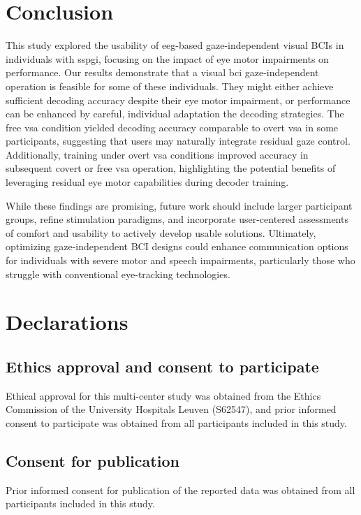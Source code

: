 \documentclass{article}
\begin{document}
\section{Conclusion}
This study explored the usability of \ac{eeg}-based gaze-independent visual BCIs in
individuals with \ac{sspgi}, focusing on the impact of eye motor impairments
on performance.
Our results demonstrate that a visual \ac{bci} gaze-independent operation is feasible
for some of these individuals.
They might either achieve sufficient decoding accuracy despite their eye
motor impairment, or performance can be enhanced by careful, individual
adaptation the decoding strategies.
The free \ac{vsa} condition yielded decoding accuracy comparable to overt \ac{vsa} in some participants, suggesting that users may naturally integrate residual gaze control.
Additionally, training under overt \ac{vsa} conditions improved accuracy in
subsequent covert or free \ac{vsa} operation, highlighting the potential benefits of
leveraging residual eye motor capabilities during decoder training.

While these findings are promising, future work should include larger
participant groups, refine stimulation paradigms, and incorporate
user-centered assessments of comfort and usability to actively develop usable
solutions.
Ultimately, optimizing gaze-independent BCI designs could enhance communication
options for individuals with severe motor and speech impairments, particularly
those who struggle with conventional eye-tracking technologies.

\printacronyms%

\section*{Declarations}
\subsection*{Ethics approval and consent to participate}
Ethical approval for this multi-center study was obtained from the Ethics
Commission of the University Hospitals Leuven (S62547),
and prior informed consent to participate  was obtained from
all participants included in this study.

\subsection*{Consent for publication}
Prior informed consent for publication of the reported data was obtained from
all participants included in this study.
\end{document}
